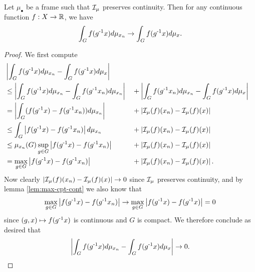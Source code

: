 \begin{lemma}\label{lem:pres-cont-integral-convergence}
    Let $\mu_\bullet$ be a frame such that $\mathcal{I}_\mu$ preserves continuity.
    Then for any continuous function $f : X \to \mathbb{R}$, we have
    \[
        \int_G f(g^{\text{-}1} x) d \mu_{x_n}
        \to \int_G f(g^{\text{-}1} x) d \mu_x.
    \]
    \begin{proof}
        We first compute
        \begin{alignat*}{2}
            &\left| \int_G f(g^{\text{-}1} x) d \mu_{x_n} - \int_G f(g^{\text{-}1} x) d \mu_x \right| \\
            &\leq \left| \int_G f(g^{\text{-}1} x) d \mu_{x_n} - \int_G f(g^{\text{-}1} x_n) d \mu_{x_n} \right|
            &&+ \left| \int_G f(g^{\text{-}1} x_n) d \mu_{x_n} - \int_G f(g^{\text{-}1} x) d \mu_x \right| \\
            &= \left| \int_G (f(g^{\text{-}1} x) - f(g^{\text{-}1} x_n)) d \mu_{x_n} \right|
            &&+ \left| \mathcal{I}_\mu (f) (x_n) - \mathcal{I}_\mu (f) (x) \right| \\
            &\leq \int_G \left| f(g^{\text{-}1} x) - f(g^{\text{-}1} x_n) \right| d \mu_{x_n}
            &&+ \left| \mathcal{I}_\mu (f) (x_n) - \mathcal{I}_\mu (f) (x) \right| \\
            &\leq \mu_{x_n} (G) \sup_{g \in G} \left| f(g^{\text{-}1} x) - f(g^{\text{-}1} x_n) \right|
            &&+ \left| \mathcal{I}_\mu (f) (x_n) - \mathcal{I}_\mu (f) (x) \right| \\
            &= \max_{g \in G} \left| f(g^{\text{-}1} x) - f(g^{\text{-}1} x_n) \right|
            &&+ \left| \mathcal{I}_\mu (f) (x_n) - \mathcal{I}_\mu (f) (x) \right|.
        \end{alignat*}
        Now clearly $\left| \mathcal{I}_\mu (f) (x_n) - \mathcal{I}_\mu (f) (x) \right| \to 0$ since $\mathcal{I}_\mu$ preserves continuity, and by lemma \ref{lem:max-cpt-cont} we also know that
        \[
            \max_{g \in G} \left| f(g^{\text{-}1} x) - f(g^{\text{-}1} x_n) \right|
            \to \max_{g \in G} \left| f(g^{\text{-}1} x) - f(g^{\text{-}1} x) \right|
            = 0
        \]
        since $(g,x) \mapsto f(g^{\text{-}1}x)$ is continuous and $G$ is compact.
        We therefore conclude as desired that
        \[
            \left| \int_G f(g^{\text{-}1} x) d \mu_{x_n} - \int_G f(g^{\text{-}1} x) d \mu_x \right| \to 0.
        \]
    \end{proof}
\end{lemma}


